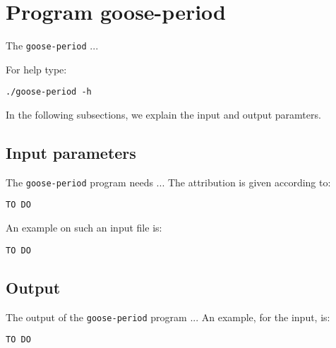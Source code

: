 \section{Program goose-period}
The \texttt{goose-period} ...

For help type:
\begin{lstlisting}
./goose-period -h
\end{lstlisting}
In the following subsections, we explain the input and output paramters.

\subsection*{Input parameters}

The \texttt{goose-period} program needs ...
The attribution is given according to:
\begin{lstlisting}
TO DO
\end{lstlisting}

An example on such an input file is:
\begin{lstlisting}
TO DO
\end{lstlisting}

\subsection*{Output}
The output of the \texttt{goose-period} program ...
An example, for the input, is:
\begin{lstlisting}
TO DO
\end{lstlisting}
